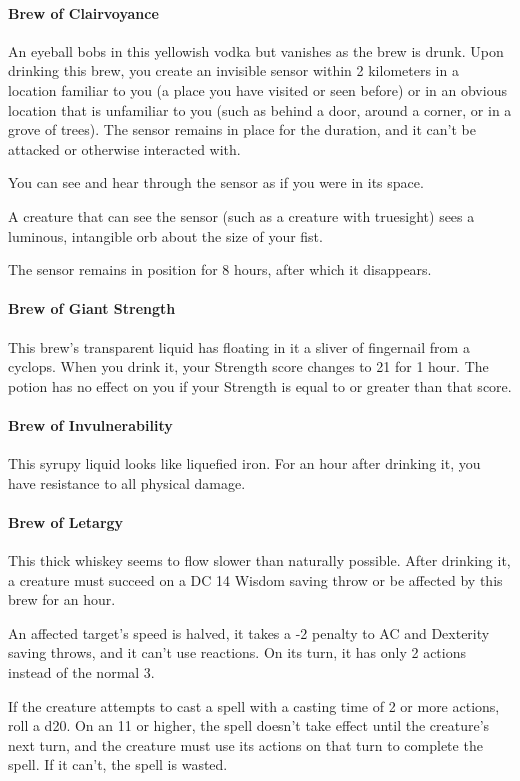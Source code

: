 \paragraph{Brew of Clairvoyance} %
    An eyeball bobs in this yellowish vodka but vanishes as the brew is drunk.
    Upon drinking this brew, you create an invisible sensor within 2 kilometers in a location familiar to you (a place you have visited or seen before) or in an obvious location that is unfamiliar to you (such as behind a door, around a corner, or in a grove of trees).
    The sensor remains in place for the duration, and it can't be attacked or otherwise interacted with.

    You can see and hear through the sensor as if you were in its space.

    A creature that can see the sensor (such as a creature with truesight) sees a luminous, intangible orb about the size of your fist.

    The sensor remains in position for 8 hours, after which it disappears.
\paragraph{Brew of Giant Strength}
    This brew's transparent liquid has floating in it a sliver of fingernail from a cyclops.
    When you drink it, your Strength score changes to 21 for 1 hour.
    The potion has no effect on you if your Strength is equal to or greater than that score.
\paragraph{Brew of Invulnerability}
    This syrupy liquid looks like liquefied iron.
    For an hour after drinking it, you have resistance to all physical damage.
\paragraph{Brew of Letargy} %
    This thick whiskey seems to flow slower than naturally possible.
    After drinking it, a creature must succeed on a DC 14 Wisdom saving throw or be affected by this brew for an hour.

    An affected target's speed is halved, it takes a -2 penalty to AC and Dexterity saving throws, and it can't use reactions.
    On its turn, it has only 2 actions instead of the normal 3.

    If the creature attempts to cast a spell with a casting time of 2 or more actions, roll a d20.
    On an 11 or higher, the spell doesn't take effect until the creature's next turn, and the creature must use its actions on that turn to complete the spell.
    If it can't, the spell is wasted.

